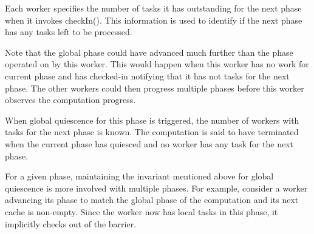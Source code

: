 Each worker specifies the number of tasks it has
outstanding for the next phase when it invokes {\java
  checkIn()}. This information is used to identify if the next phase
has any tasks left to be processed. 

Note that the global phase could have advanced much further than the
phase operated on by this worker. This would happen when this worker
has no work for current phase and has checked-in notifying that it has
not tasks for the next phase. The other workers could then progress
multiple phases before this worker observes the computation progress. 

When global quiescence for this phase is triggered, the number of
workers with tasks for the next phase is known. The computation is
said to have terminated when the current phase has quiesced and no
worker has any task for the next phase. 

For a given phase, maintaining the invariant mentioned above for
global quiescence is more involved with multiple phases. For example,
consider a worker advancing its phase to match the global phase of the
computation and its next cache is non-empty. Since the worker now has
local tasks in this phase, it implicitly checks out of the barrier.

